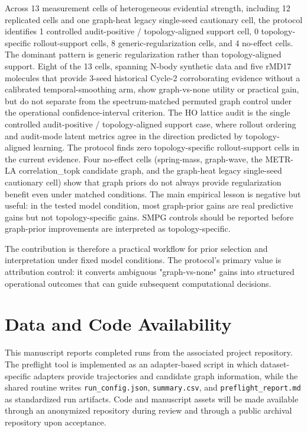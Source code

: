 \documentclass[preprint,12pt]{elsarticle}
\begin{document}
Across 13 measurement cells of heterogeneous evidential strength, 
including 12 replicated cells and one graph-heat legacy single-seed 
cautionary cell, the protocol identifies 1 controlled audit-positive / 
topology-aligned support cell, 0 topology-specific rollout-support cells, 
8 generic-regularization cells, and 4 no-effect cells. The dominant 
pattern is generic regularization rather than topology-aligned support. 
Eight of the 13 cells, spanning N-body synthetic data and five rMD17 
molecules that provide 3-seed historical Cycle-2 corroborating evidence 
without a calibrated temporal-smoothing arm, show graph-vs-none utility 
or practical gain, but do not separate from the spectrum-matched 
permuted graph control under the operational confidence-interval 
criterion. The HO 
lattice audit is the single controlled audit-positive / topology-aligned 
support case, where rollout ordering and audit-mode latent metrics agree 
in the direction predicted by topology-aligned learning. The protocol 
finds zero topology-specific rollout-support cells in the current 
evidence. Four no-effect cells (spring-mass, graph-wave, the METR-LA 
correlation\_topk candidate graph, and the graph-heat legacy single-seed cautionary cell) show 
that graph priors do not always provide regularization benefit even 
under matched conditions. The main empirical lesson is negative but 
useful: in the tested model condition, most graph-prior gains are real 
predictive gains but not topology-specific gains. SMPG controls should 
be reported before graph-prior improvements are interpreted as 
topology-specific.

The contribution is therefore a practical workflow for prior 
selection and interpretation under fixed model conditions. The 
protocol's primary value is attribution control: it converts ambiguous 
"graph-vs-none" gains into structured operational outcomes that can 
guide subsequent computational decisions.

\section*{Data and Code Availability}
This manuscript reports completed runs from the associated project repository. The preflight tool is implemented as an adapter-based script in which dataset-specific adapters provide trajectories and candidate graph information, while the shared routine writes \texttt{run\_config.json}, \texttt{summary.csv}, and \texttt{preflight\_report.md} as standardized run artifacts. Code and manuscript assets will be made available through an anonymized repository during review and through a public archival repository upon acceptance.
\end{document}
